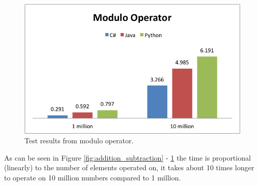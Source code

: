 \begin{figure}[h]
	\centering
	\includegraphics[width=0.48\linewidth]{chapters/media/modulo.png}
	\caption{Test results from modulo operator.}
	\label{fig:modulo}
\end{figure}

As can be seen in Figure \ref{fig:addition_subtraction} - \ref{fig:modulo} the time is proportional (linearly) to the number of elements operated on, it takes about 10 times longer to operate on 10 million numbers compared to 1 million.  
